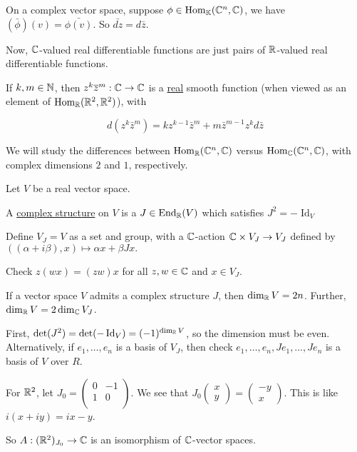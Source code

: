 \documentclass[x11names,reqno,14pt]{extarticle}
\begin{document}
On a complex vector space, suppose $\phi\in{\mathrm{Hom}}_{\mathbb{K}}(\mathbb{C}^n,\mathbb{C})$, we have $(\bar{\phi})(v) = \bar{\phi(v)}.$ So $\bar{dz} = d\bar{z}$. 

Now, $\mathbb{C}$-valued real differentiable functions are just pairs of $\mathbb{R}$-valued real differentiable functions. 

\exm

If $k, m \in \mathbb{N}$, then $z^k\overline{z}^m:\mathbb{C}\to\mathbb{C}$ is a \underline{real} smooth function (when viewed as an element of ${\mathrm{Hom}}_{\mathbb{R}}(\mathbb{R}^2, \mathbb{R}^2)$), with

\[
d(z^k\bar{z}^m) = kz^{k - 1}\bar{z}^m + m\bar{z}^{m - 1}z^kd\bar{z}
\]

We will study the differences between ${\mathrm{Hom}}_{\mathbb{R}}(\mathbb{C}^n, \mathbb{C})$ versus ${\mathrm{Hom}}_{\mathbb{C}}(\mathbb{C}^n, \mathbb{C})$, with complex dimensions $2$ and $1$, respectively. 

 Let $V$ be a real vector space. 

A \underline{complex structure} on $V$ is a $J \in {\mathrm{End}}_{\mathbb{R}}(V)$ which satisfies $J^2 = -\operatorname{Id}_V$

\prop Define $V_J = V$ as a set and group, with a $\mathbb{C}$-action $\mathbb{C}\times V_J \to V_J$ defined by $((\alpha + i\beta), x) \mapsto \alpha x + \beta Jx.$

\proof Check $z(wx) = (zw)x$ for all $z, w \in \mathbb{C}$ and $x \in V_J$. 

\prop If a vector space $V$ admits a complex structure $J$, then $\dim_{\mathbb{R}} V = 2n$. Further, $\dim_{\mathbb{R}} V = 2\dim_{\mathbb{C}} V_J$. 

\proof 

First, $\det(J^2) = \det(-\operatorname{\mathrm{Id}}_V) = (-1)^{\dim_{\mathbb{R}} V}$, so the dimension must be even. Alternatively, if $e_1, \dots, e_n$ is a basis of $V_J$, then check $e_1, \dots, e_n, Je_1, \dots, Je_n$ is a basis of $V$ over $R$.

\exm For $\mathbb{R}^2$, let $J_0 = \begin{pmatrix} 0 & - 1\\ 1 & 0 \\ \end{pmatrix}$. We see that $J_0\begin{pmatrix}x \\ y\end{pmatrix} = \begin{pmatrix} -y \\ x \end{pmatrix}$.  This is like $i(x + iy) = ix - y$.

So $A: (\mathbb{R}^2)_{J_0} \to \mathbb{C}$ is an isomorphism of $\mathbb{C}$-vector spaces. 
\end{document}
